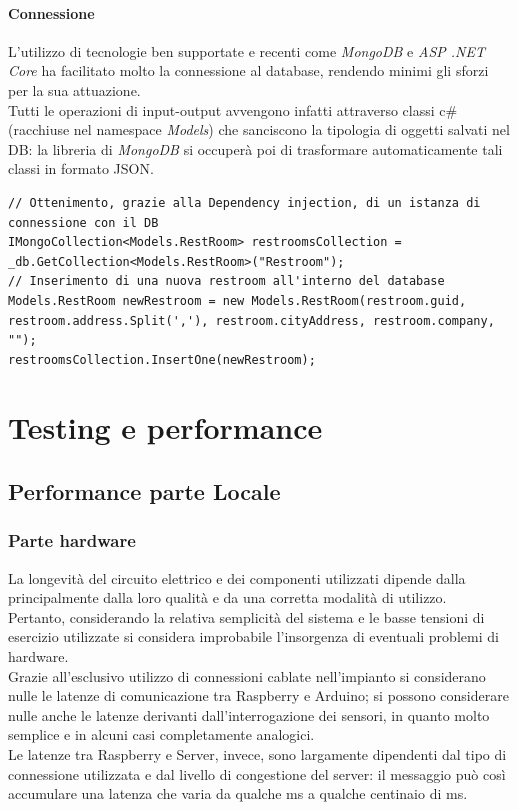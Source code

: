 \documentclass[12pt]{article}
\begin{document}
\paragraph{Connessione}
L'utilizzo di tecnologie ben supportate e recenti come \textit{MongoDB} e \textit{ASP .NET Core} ha facilitato molto la connessione al database, rendendo minimi gli sforzi per la sua attuazione.\\
Tutti le operazioni di input-output avvengono infatti attraverso classi c\# (racchiuse nel namespace \textit{Models}) che sanciscono la tipologia di oggetti salvati nel DB: la libreria di \textit{MongoDB} si occuperà poi di trasformare automaticamente tali classi in formato JSON.

\begin{lstlisting}
// Ottenimento, grazie alla Dependency injection, di un istanza di connessione con il DB
IMongoCollection<Models.RestRoom> restroomsCollection = _db.GetCollection<Models.RestRoom>("Restroom");
// Inserimento di una nuova restroom all'interno del database
Models.RestRoom newRestroom = new Models.RestRoom(restroom.guid, restroom.address.Split(','), restroom.cityAddress, restroom.company, "");
restroomsCollection.InsertOne(newRestroom);

\end{lstlisting}
\newpage

\section{Testing e performance}
\subsection{Performance parte Locale}
\subsubsection{Parte hardware}
La longevità del circuito elettrico e dei componenti utilizzati dipende dalla principalmente dalla loro qualità e da una corretta modalità di utilizzo.\\
Pertanto, considerando la relativa semplicità del sistema e le basse tensioni di esercizio utilizzate si considera improbabile l'insorgenza di eventuali problemi di hardware.\\
Grazie all'esclusivo utilizzo di connessioni cablate nell'impianto si considerano nulle le latenze di comunicazione tra Raspberry e Arduino; si possono considerare nulle anche le latenze derivanti dall'interrogazione dei sensori, in quanto molto semplice e in alcuni casi completamente analogici.\\
Le latenze tra Raspberry e Server, invece, sono largamente dipendenti dal tipo di connessione utilizzata e dal livello di congestione del server: il messaggio può così accumulare una latenza che varia da qualche ms a qualche centinaio di ms.
\end{document}
